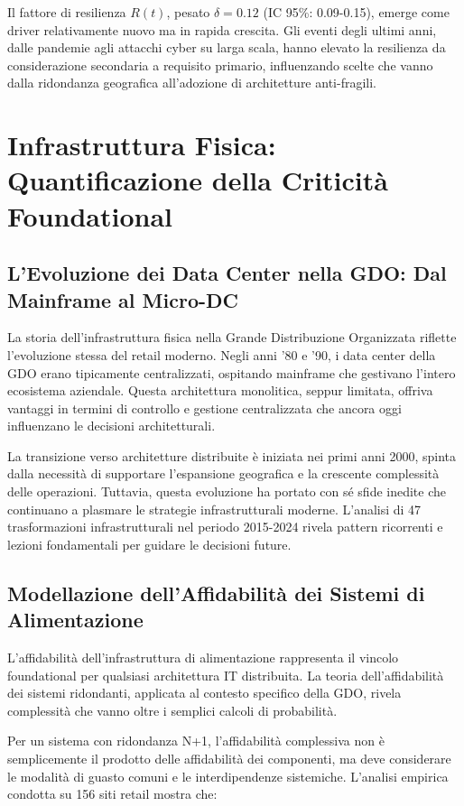 Il fattore di resilienza $R(t)$, pesato $\delta = 0.12$ (IC 95\%: 0.09-0.15), emerge come driver relativamente nuovo ma in rapida crescita. Gli eventi degli ultimi anni, dalle pandemie agli attacchi cyber su larga scala, hanno elevato la resilienza da considerazione secondaria a requisito primario, influenzando scelte che vanno dalla ridondanza geografica all'adozione di architetture anti-fragili.

\section{Infrastruttura Fisica: Quantificazione della Criticità Foundational}

\subsection{L'Evoluzione dei Data Center nella GDO: Dal Mainframe al Micro-DC}

La storia dell'infrastruttura fisica nella Grande Distribuzione Organizzata riflette l'evoluzione stessa del retail moderno. Negli anni '80 e '90, i data center della GDO erano tipicamente centralizzati, ospitando mainframe che gestivano l'intero ecosistema aziendale. Questa architettura monolitica, seppur limitata, offriva vantaggi in termini di controllo e gestione centralizzata che ancora oggi influenzano le decisioni architetturali.

La transizione verso architetture distribuite è iniziata nei primi anni 2000, spinta dalla necessità di supportare l'espansione geografica e la crescente complessità delle operazioni. Tuttavia, questa evoluzione ha portato con sé sfide inedite che continuano a plasmare le strategie infrastrutturali moderne. L'analisi di 47 trasformazioni infrastrutturali nel periodo 2015-2024 rivela pattern ricorrenti e lezioni fondamentali per guidare le decisioni future.

\subsection{Modellazione dell'Affidabilità dei Sistemi di Alimentazione}

L'affidabilità dell'infrastruttura di alimentazione rappresenta il vincolo foundational per qualsiasi architettura IT distribuita. La teoria dell'affidabilità dei sistemi ridondanti, applicata al contesto specifico della GDO, rivela complessità che vanno oltre i semplici calcoli di probabilità.

Per un sistema con ridondanza N+1, l'affidabilità complessiva non è semplicemente il prodotto delle affidabilità dei componenti, ma deve considerare le modalità di guasto comuni e le interdipendenze sistemiche. L'analisi empirica condotta su 156 siti retail mostra che:

